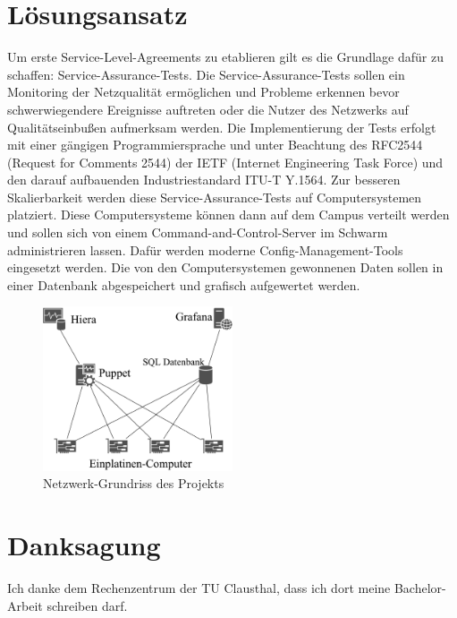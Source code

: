 \documentclass[conference]{IEEEtran}
\begin{document}
\section*{Lösungsansatz}
Um erste Service-Level-Agreements zu etablieren gilt es die Grundlage
dafür zu schaffen: Service-Assurance-Tests. Die Service-Assurance-Tests
sollen ein Monitoring der Netzqualität ermöglichen und Probleme erkennen
bevor schwerwiegendere Ereignisse auftreten oder die Nutzer des
Netzwerks auf Qualitätseinbußen aufmerksam werden. Die Implementierung
der Tests erfolgt mit einer gängigen Programmiersprache und unter
Beachtung des RFC2544 (Request for Comments 2544) der IETF (Internet
Engineering Task Force) und den darauf aufbauenden Industriestandard
ITU-T Y.1564.  Zur besseren Skalierbarkeit werden diese
Service-Assurance-Tests auf Computersystemen platziert. Diese
Computersysteme können dann auf dem Campus verteilt werden und
sollen sich von einem Command-and-Control-Server im Schwarm
administrieren lassen. Dafür werden moderne Config-Management-Tools
eingesetzt werden. Die von den Computersystemen gewonnenen Daten
sollen in einer Datenbank abgespeichert und grafisch aufgewertet werden.
\begin{figure}[h]
    \centering
    \includegraphics[width=0.5\textwidth]{figures/network.pdf}
    \caption{Netzwerk-Grundriss des Projekts}\label{fig:1}
\end{figure}

\section*{Danksagung}
Ich danke dem Rechenzentrum der TU Clausthal, dass ich dort meine
Bachelor-Arbeit schreiben darf.
\end{document}
